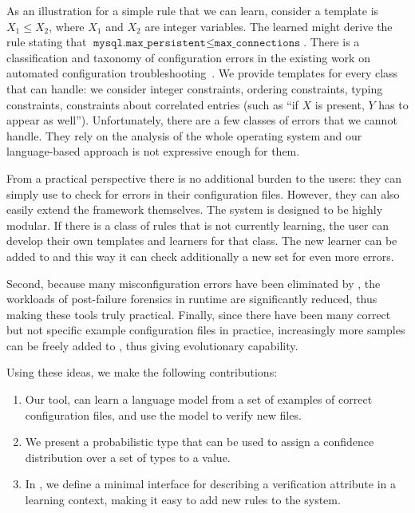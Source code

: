 As an 
illustration for a simple rule that we can learn, consider a template is $X_1 \le X_2$, where $X_1$ and $X_2$ are
integer variables. The learned might derive the rule stating that
$\texttt{mysql.max\_persistent} \le \texttt{max\_connections}$. There is a classification and taxonomy of configuration errors in the 
existing work on automated configuration troubleshooting~\cite{yin11anempirical, configdataset}. We provide templates for every class that \app can handle: we consider integer constraints, ordering
constraints, typing constraints, constraints about correlated entries (such as ``if $X$ is present, $Y$ has to appear as well''). Unfortunately, there are a few classes of errors that we cannot handle. They
 rely on the analysis of the whole operating system and our language-based
approach is not expressive enough for them. 

From a  practical perspective there is no additional burden 
to the users: they can simply use \app to check for errors in their configuration files. However, they can also easily extend the framework themselves. The system is designed to be highly modular. If there is a class of rules that \app is not currently learning, the user can develop their own templates and learners for that class. The new learner can be added to \app and this way it can check additionally a new set 
for even more errors.

Second, because many misconfiguration errors have been eliminated 
by \app, the workloads of post-failure forensics in runtime
are significantly reduced, thus making these tools truly practical.
Finally, since there have been many correct but not specific 
example configuration files in practice, 
increasingly more samples can be freely added to \app,
thus giving \app evolutionary capability.

Using these ideas, we make the following contributions:

\begin{enumerate}

  \item Our tool, \app can learn a language model from a set of examples of correct configuration files, and use the model to verify new files.
  \item We present a probabilistic type that can be used to assign a confidence distribution over a set of types to a value.
  \item In \app, we define a minimal interface for describing a verification attribute in a learning context, making it easy to add new rules to the system.

\end{enumerate}
